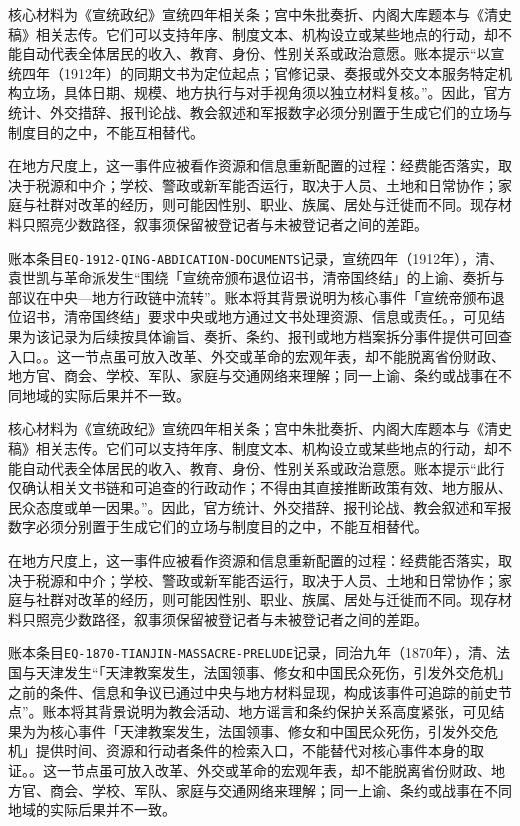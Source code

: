 核心材料为《宣统政纪》宣统四年相关条；宫中朱批奏折、内阁大库题本与《清史稿》相关志传。它们可以支持年序、制度文本、机构设立或某些地点的行动，却不能自动代表全体居民的收入、教育、身份、性别关系或政治意愿。账本提示“以宣统四年（1912年）的同期文书为定位起点；官修记录、奏报或外交文本服务特定机构立场，具体日期、规模、地方执行与对手视角须以独立材料复核。”。因此，官方统计、外交措辞、报刊论战、教会叙述和军报数字必须分别置于生成它们的立场与制度目的之中，不能互相替代。

在地方尺度上，这一事件应被看作资源和信息重新配置的过程：经费能否落实，取决于税源和中介；学校、警政或新军能否运行，取决于人员、土地和日常协作；家庭与社群对改革的经历，则可能因性别、职业、族属、居处与迁徙而不同。现存材料只照亮少数路径，叙事须保留被登记者与未被登记者之间的差距。

账本条目\texttt{EQ-1912-QING-ABDICATION-DOCUMENTS}记录，宣统四年（1912年），清、袁世凯与革命派发生“围绕「宣统帝颁布退位诏书，清帝国终结」的上谕、奏折与部议在中央—地方行政链中流转”。账本将其背景说明为核心事件「宣统帝颁布退位诏书，清帝国终结」要求中央或地方通过文书处理资源、信息或责任。，可见结果为该记录为后续按具体谕旨、奏折、条约、报刊或地方档案拆分事件提供可回查入口。。这一节点虽可放入改革、外交或革命的宏观年表，却不能脱离省份财政、地方官、商会、学校、军队、家庭与交通网络来理解；同一上谕、条约或战事在不同地域的实际后果并不一致。

核心材料为《宣统政纪》宣统四年相关条；宫中朱批奏折、内阁大库题本与《清史稿》相关志传。它们可以支持年序、制度文本、机构设立或某些地点的行动，却不能自动代表全体居民的收入、教育、身份、性别关系或政治意愿。账本提示“此行仅确认相关文书链和可追查的行政动作；不得由其直接推断政策有效、地方服从、民众态度或单一因果。”。因此，官方统计、外交措辞、报刊论战、教会叙述和军报数字必须分别置于生成它们的立场与制度目的之中，不能互相替代。

在地方尺度上，这一事件应被看作资源和信息重新配置的过程：经费能否落实，取决于税源和中介；学校、警政或新军能否运行，取决于人员、土地和日常协作；家庭与社群对改革的经历，则可能因性别、职业、族属、居处与迁徙而不同。现存材料只照亮少数路径，叙事须保留被登记者与未被登记者之间的差距。

账本条目\texttt{EQ-1870-TIANJIN-MASSACRE-PRELUDE}记录，同治九年（1870年），清、法国与天津发生“「天津教案发生，法国领事、修女和中国民众死伤，引发外交危机」之前的条件、信息和争议已通过中央与地方材料显现，构成该事件可追踪的前史节点”。账本将其背景说明为教会活动、地方谣言和条约保护关系高度紧张，可见结果为为核心事件「天津教案发生，法国领事、修女和中国民众死伤，引发外交危机」提供时间、资源和行动者条件的检索入口，不能替代对核心事件本身的取证。。这一节点虽可放入改革、外交或革命的宏观年表，却不能脱离省份财政、地方官、商会、学校、军队、家庭与交通网络来理解；同一上谕、条约或战事在不同地域的实际后果并不一致。

